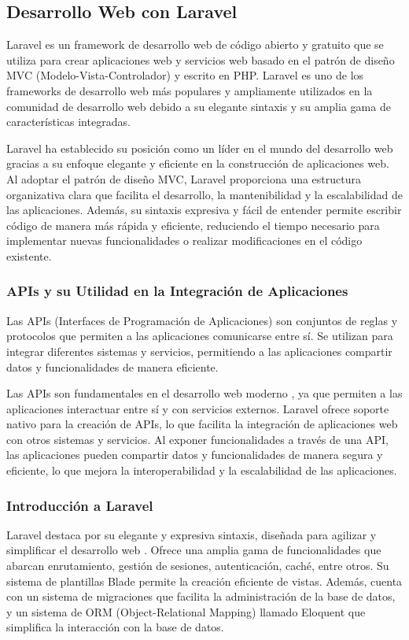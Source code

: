 \subsection{Desarrollo Web con Laravel}
Laravel es un framework de desarrollo web de código abierto y gratuito que se utiliza para crear aplicaciones web y servicios web basado en el patrón de diseño MVC (Modelo-Vista-Controlador) y escrito en PHP. Laravel es uno de los frameworks de desarrollo web más populares y ampliamente utilizados en la comunidad de desarrollo web debido a su elegante sintaxis y su amplia gama de características integradas.

Laravel ha establecido su posición como un líder en el mundo del desarrollo web gracias a su enfoque elegante y eficiente en la construcción de aplicaciones web. Al adoptar el patrón de diseño MVC, Laravel proporciona una estructura organizativa clara que facilita el desarrollo, la mantenibilidad y la escalabilidad de las aplicaciones. Además, su sintaxis expresiva y fácil de entender permite escribir código de manera más rápida y eficiente, reduciendo el tiempo necesario para implementar nuevas funcionalidades o realizar modificaciones en el código existente.

\subsubsection{APIs y su Utilidad en la Integración de Aplicaciones}
Las APIs (Interfaces de Programación de Aplicaciones) son conjuntos de reglas y protocolos que permiten a las aplicaciones comunicarse entre sí. Se utilizan para integrar diferentes sistemas y servicios, permitiendo a las aplicaciones compartir datos y funcionalidades de manera eficiente. 

Las APIs son fundamentales en el desarrollo web moderno \cite{API}, ya que permiten a las aplicaciones interactuar entre sí y con servicios externos. Laravel ofrece soporte nativo para la creación de APIs, lo que facilita la integración de aplicaciones web con otros sistemas y servicios. Al exponer funcionalidades a través de una API, las aplicaciones pueden compartir datos y funcionalidades de manera segura y eficiente, lo que mejora la interoperabilidad y la escalabilidad de las aplicaciones.

\subsubsection{Introducción a Laravel}
Laravel destaca por su elegante y expresiva sintaxis, diseñada para agilizar y simplificar el desarrollo web \cite{laravel}. Ofrece una amplia gama de funcionalidades que abarcan enrutamiento, gestión de sesiones, autenticación, caché, entre otros. Su sistema de plantillas Blade permite la creación eficiente de vistas. Además, cuenta con un sistema de migraciones que facilita la administración de la base de datos, y un sistema de ORM (Object-Relational Mapping) llamado Eloquent que simplifica la interacción con la base de datos.

